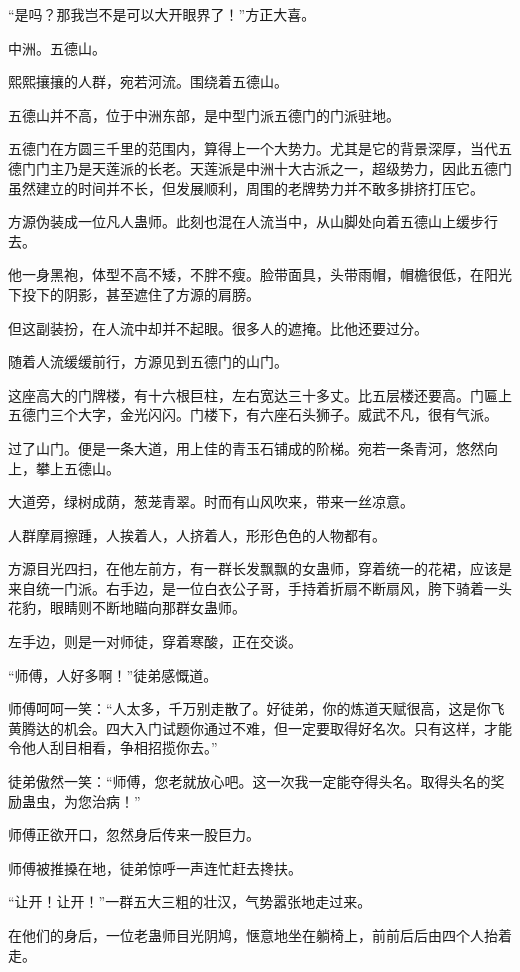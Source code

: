 \begin{this_body}
“是吗？那我岂不是可以大开眼界了！”方正大喜。

中洲。五德山。

熙熙攘攘的人群，宛若河流。围绕着五德山。

五德山并不高，位于中洲东部，是中型门派五德门的门派驻地。

五德门在方圆三千里的范围内，算得上一个大势力。尤其是它的背景深厚，当代五德门门主乃是天莲派的长老。天莲派是中洲十大古派之一，超级势力，因此五德门虽然建立的时间并不长，但发展顺利，周围的老牌势力并不敢多排挤打压它。

方源伪装成一位凡人蛊师。此刻也混在人流当中，从山脚处向着五德山上缓步行去。

他一身黑袍，体型不高不矮，不胖不瘦。脸带面具，头带雨帽，帽檐很低，在阳光下投下的阴影，甚至遮住了方源的肩膀。

但这副装扮，在人流中却并不起眼。很多人的遮掩。比他还要过分。

随着人流缓缓前行，方源见到五德门的山门。

这座高大的门牌楼，有十六根巨柱，左右宽达三十多丈。比五层楼还要高。门匾上五德门三个大字，金光闪闪。门楼下，有六座石头狮子。威武不凡，很有气派。

过了山门。便是一条大道，用上佳的青玉石铺成的阶梯。宛若一条青河，悠然向上，攀上五德山。

大道旁，绿树成荫，葱茏青翠。时而有山风吹来，带来一丝凉意。

人群摩肩擦踵，人挨着人，人挤着人，形形色色的人物都有。

方源目光四扫，在他左前方，有一群长发飘飘的女蛊师，穿着统一的花裙，应该是来自统一门派。右手边，是一位白衣公子哥，手持着折扇不断扇风，胯下骑着一头花豹，眼睛则不断地瞄向那群女蛊师。

左手边，则是一对师徒，穿着寒酸，正在交谈。

“师傅，人好多啊！”徒弟感慨道。

师傅呵呵一笑：“人太多，千万别走散了。好徒弟，你的炼道天赋很高，这是你飞黄腾达的机会。四大入门试题你通过不难，但一定要取得好名次。只有这样，才能令他人刮目相看，争相招揽你去。”

徒弟傲然一笑：“师傅，您老就放心吧。这一次我一定能夺得头名。取得头名的奖励蛊虫，为您治病！”

师傅正欲开口，忽然身后传来一股巨力。

师傅被推搡在地，徒弟惊呼一声连忙赶去搀扶。

“让开！让开！”一群五大三粗的壮汉，气势嚣张地走过来。

在他们的身后，一位老蛊师目光阴鸠，惬意地坐在躺椅上，前前后后由四个人抬着走。


\end{this_body}
